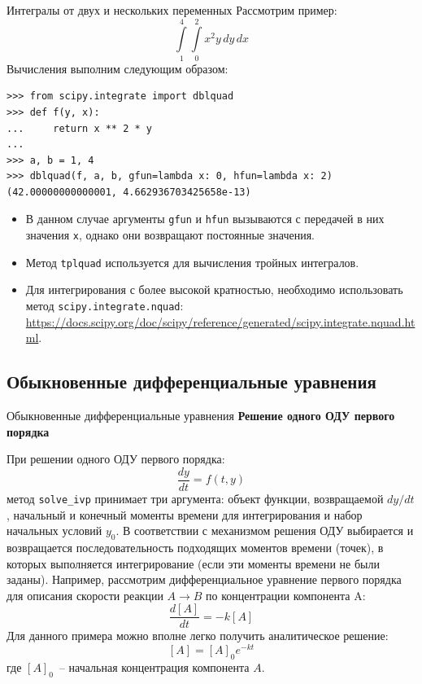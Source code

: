 \documentclass[aspectratio=169, mathserif]{beamer}	%
\begin{document}
\begin{frame}[fragile, label=c]{Интегралы от двух и нескольких переменных}
\scriptsize
Рассмотрим пример:
\vfill
$$
	\int\limits_{1}^{4}\int\limits_{0}^{2} x^2y \, dy \, dx
$$
\vfill
Вычисления выполним следующим образом:
\vfill
\begin{verbatim}
>>> from scipy.integrate import dblquad
>>> def f(y, x):
...     return x ** 2 * y
...
>>> a, b = 1, 4
>>> dblquad(f, a, b, gfun=lambda x: 0, hfun=lambda x: 2)
(42.00000000000001, 4.662936703425658e-13)
\end{verbatim}
\vfill
\begin{itemize}
	\item В данном случае аргументы \texttt{gfun} и \texttt{hfun} вызываются с передачей в них значения \texttt{x}, однако они возвращают постоянные значения.
	\item Метод \texttt{tplquad} используется для вычисления тройных интегралов.
	\item Для интегрирования с более высокой кратностью, необходимо использовать метод \texttt{scipy.integrate.nquad}: \url{https://docs.scipy.org/doc/scipy/reference/generated/scipy.integrate.nquad.html}.
\end{itemize}
\vfill
\end{frame}


\subsection{Обыкновенные дифференциальные уравнения}
\begin{frame}[fragile, label=c]{Обыкновенные дифференциальные уравнения}
\scriptsize
\textcolor{tpugreen}{\textbf{Решение одного ОДУ первого порядка}}

При решении одного ОДУ первого порядка:
\vfill
$$
	\dfrac{dy}{dt} = f(t, y)
$$
\vfill
\noindent метод \texttt{solve\_ivp} принимает три аргумента: объект функции, возвращаемой $dy/dt$, начальный и конечный моменты времени для интегрирования и набор начальных условий $y_0$.
\vfill
В соответствии с механизмом решения ОДУ выбирается и возвращается последовательность подходящих моментов времени (точек), в которых выполняется интегрирование (если эти моменты времени не были заданы).
\vfill
Например, рассмотрим дифференциальное уравнение первого порядка для описания скорости реакции $A \rightarrow B$ по концентрации компонента A:
\vfill
$$
	\dfrac{d\left[A\right]}{dt} = -k\left[A\right]
$$
\vfill
Для данного примера можно вполне легко получить аналитическое решение:
\vfill
$$
	\left[A\right] = \left[A\right]_0e^{-kt}
$$
\vfill
\noindent где $\left[A\right]_0$~-- начальная концентрация компонента $A$.
\vfill
\end{frame}
\end{document}
